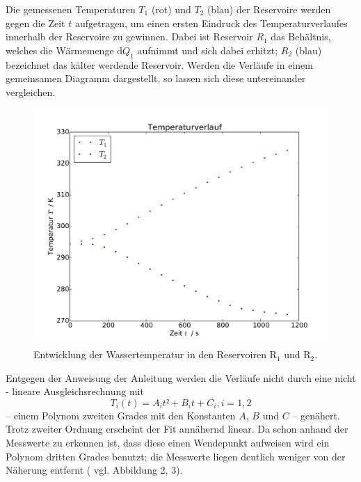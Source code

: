Die gemessenen Temperaturen $T_1$ (rot) und $T_2$ (blau) der Reservoire werden gegen die Zeit $t$ aufgetragen, um einen ersten Eindruck des Temperaturverlaufes innerhalb der Reservoire zu gewinnen. Dabei ist Reservoir $R_1$ das Behältnis, welches die Wärmemenge $\mathup{d}Q_1$ aufnimmt und sich dabei erhitzt; $R_2$ (blau) bezeichnet das kälter werdende Reservoir.  Werden die Verläufe in einem gemeinsamen Diagramm dargestellt, so lassen sich diese untereinander vergleichen. 
\newpage
\begin{figure}
\includegraphics[width=\textwidth]{Bilder/Temperaturverlauf.pdf}
	\caption{Entwicklung der Wassertemperatur in den Reservoiren $\mathup{R_1}$ und $\mathup{R_2}$.}
	\label{fig:temperaturverlauf}
\end{figure}


Entgegen der Anweisung der Anleitung werden die Verläufe nicht durch eine nicht - lineare Ausgleichsrechnung mit
\begin{equation}
	T_i(t)=A_i t² + B_i t + C_i , i=1,2
	\label{eq:t-verlauf_Grad2}
\end{equation}
 -- einem Polynom zweiten Grades mit den Konstanten $A$, $B$ und $C$ -- genähert. Trotz zweiter Ordnung erscheint der Fit annähernd linear. Da schon anhand der Messwerte zu erkennen ist, dass diese einen Wendepunkt aufweisen wird ein Polynom dritten Grades benutzt; die Messwerte liegen deutlich weniger von der Näherung entfernt ( vgl. Abbildung 2, 3).

